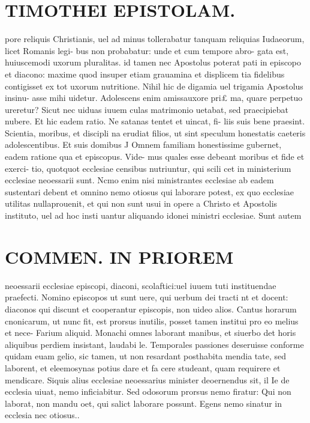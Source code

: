 \documentclass{article}
\begin{document}
\begin{pages}
\section*{TIMOTHEI EPISTOLAM. }
\marginpar{[ p.85 ]}\pstart pore reliquis Christianis, uel ad minus tollerabatur tanquam reliquias Iudaeorum, licet Romanis legi- bus non probabatur: unde et cum tempore abro- gata est, huiuscemodi uxorum pluralitas. id tamen nec Apostolus poterat pati in episcopo et diacono: maxime quod insuper etiam grauamina et displicem tia fidelibus contigisset ex tot uxorum nutritione. Nihil hic de digamia uel trigamia Apostolus insinu- asse mihi uidetur. Adolescens enim amissauxore pri£ ma, quare perpetuo ureretur? Sicut nec uiduas iuuem culas matrimonio uetabat, sed praecipiebat nubere. Et hic eadem ratio. Ne satanas tentet et uincat, fi- liis suis bene praesint. Scientia, moribus, et discipli na erudiat filios, ut sint speculum honestatis caeteris adolescentibus.  \pend\pstart Et suis domibus J Omnem familiam honestissime gubernet, eadem ratione qua et episcopus. Vide- mus quales esse debeant moribus et fide et exerci- tio, quotquot ecclesiae censibus nutriuntur, qui scili cet in ministerium ecclesiae neoessarii sunt. Ncmo enim nisi ministrantes ecclesiae ab eadem sustentari debent et omnino nemo otiosus qui laborare potest, ex quo ecclesiae utilitas nullaprouenit, et qui non sunt usui in opere a Christo et Apostolis instituto, uel ad hoc insti uantur aliquando idonei ministri ecclesiae. Sunt autem  \pend
\section*{COMMEN. IN PRIOREM }
\marginpar{[ p.86 ]}\pstart neoessarii ecclesiae episcopi, diaconi, scolaftici:uel iuuem tuti instituendae praefecti. Nomino episcopos ut sunt uere, qui uerbum dei tracti nt et docent: diaconos qui discunt et cooperantur episcopis, non uideo alios. Cantus horarum cnonicarum, ut nunc fit, est prorsus inutilis, posset tamen institui pro eo melius et nece- Farium aliquid. Monachi omnes laborant manibus, et siuerbo det horis aliquibus perdiem insistant, laudabi le. Temporales passiones deseruisse conforme quidam euam gelio, sic tamen, ut non resardant posthabita mendia tate, sed laborent, et eleemosynas potius dare et fa cere studeant, quam requirere et mendicare. Siquis alius ecclesiae neoessarius minister deoernendus sit, il Ie de ecclesia uiuat, nemo inficiabitur. Sed odosorum prorsus nemo firatur: Qui non laborat, non mandu oet, qui salict laborare possunt. Egens nemo sinatur in ecclesia nec otiosus..  \pend
{}
{}

\end{pages}
\end{document}
